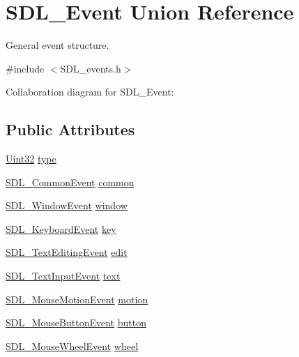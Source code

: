 \hypertarget{union_s_d_l___event}{}\section{S\+D\+L\+\_\+\+Event Union Reference}
\label{union_s_d_l___event}


General event structure.  




{\ttfamily \#include $<$S\+D\+L\+\_\+events.\+h$>$}



Collaboration diagram for S\+D\+L\+\_\+\+Event\+:
\subsection*{Public Attributes}
\begin{DoxyCompactItemize}
\item 
\hyperlink{_s_d_l__stdinc_8h_add440eff171ea5f55cb00c4a9ab8672d}{Uint32} \hyperlink{union_s_d_l___event_a237648bec242d2d5835f1a4250ddfa46}{type}
\item 
\hyperlink{struct_s_d_l___common_event}{S\+D\+L\+\_\+\+Common\+Event} \hyperlink{union_s_d_l___event_abe5cb8767f93de55163c8ddd4562a7f2}{common}
\item 
\hyperlink{struct_s_d_l___window_event}{S\+D\+L\+\_\+\+Window\+Event} \hyperlink{union_s_d_l___event_a826936b3275406d857bc6654669fae71}{window}
\item 
\hyperlink{struct_s_d_l___keyboard_event}{S\+D\+L\+\_\+\+Keyboard\+Event} \hyperlink{union_s_d_l___event_ab99927835cc77a9b6bb50b419b4a27df}{key}
\item 
\hyperlink{struct_s_d_l___text_editing_event}{S\+D\+L\+\_\+\+Text\+Editing\+Event} \hyperlink{union_s_d_l___event_a9a7e3b67b2654d4c5fc509676c6a7183}{edit}
\item 
\hyperlink{struct_s_d_l___text_input_event}{S\+D\+L\+\_\+\+Text\+Input\+Event} \hyperlink{union_s_d_l___event_aa4fc65c559d69f33c057c0c23d8414b8}{text}
\item 
\hyperlink{struct_s_d_l___mouse_motion_event}{S\+D\+L\+\_\+\+Mouse\+Motion\+Event} \hyperlink{union_s_d_l___event_ac3c89e190faacbe84280cd539453bab6}{motion}
\item 
\hyperlink{struct_s_d_l___mouse_button_event}{S\+D\+L\+\_\+\+Mouse\+Button\+Event} \hyperlink{union_s_d_l___event_ab6da2fa2687e5f849f270adecc64785f}{button}
\item 
\hyperlink{struct_s_d_l___mouse_wheel_event}{S\+D\+L\+\_\+\+Mouse\+Wheel\+Event} \hyperlink{union_s_d_l___event_a267d3f550715519ec90a81ccd0e6cbda}{wheel}

\end{DoxyCompactItemize}

